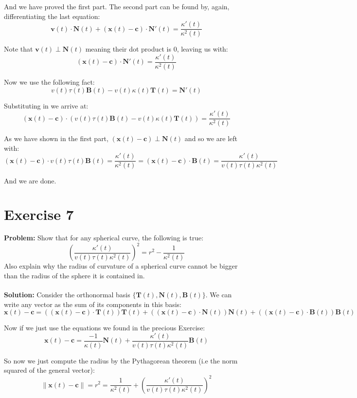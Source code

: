 \documentclass{article}
\begin{document}
And we have proved the first part. The second part can be found by, again, differentiating the last equation:
$$\mathbf v(t)\cdot\mathbf N(t)+(\mathbf x(t)-\mathbf c)\cdot\mathbf N'(t)=\frac{\kappa'(t)}{\kappa^2(t)}$$

Note that $\mathbf v(t)\perp\mathbf N(t)$ meaning their dot product is 0, leaving us with:
$$(\mathbf x(t)-\mathbf c)\cdot\mathbf N'(t)=\frac{\kappa'(t)}{\kappa^2(t)}$$

Now we use the following fact:
$$v(t)\tau(t)\mathbf B(t)-v(t)\kappa(t)\mathbf T(t)=\mathbf N'(t)$$

Substituting in we arrive at:
$$(\mathbf x(t)-\mathbf c)\cdot(v(t)\tau(t)\mathbf B(t)-v(t)\kappa(t)\mathbf T(t))=\frac{\kappa'(t)}{\kappa^2(t)}$$

As we have shown in the first part, $(\mathbf x(t)-\mathbf c)\perp\mathbf N(t)$ and so we are left with:
$$(\mathbf x(t)-\mathbf c)\cdot v(t)\tau(t)\mathbf B(t)=\frac{\kappa'(t)}{\kappa^2(t)}=(\mathbf x(t)-\mathbf c)\cdot\mathbf B(t)=\frac{\kappa'(t)}{v(t)\tau(t)\kappa^2(t)}$$

And we are done.

\section*{Exercise 7}
\textbf{Problem:} Show that for any spherical curve, the following is true:
$$\left(\frac{\kappa'(t)}{v(t)\tau(t)\kappa^2(t)}\right)^2=r^2-\frac{1}{\kappa^2(t)}$$
Also explain why the radius of curvature of a spherical curve cannot be bigger than the radius of the sphere it is contained in.
\\\\
\textbf{Solution:} Consider the orthonormal basis $\{\mathbf T(t),\mathbf N(t),\mathbf B(t)\}$. We can write any vector as the sum of its components in this basis:
$$\mathbf x(t)-\mathbf c=((\mathbf x(t)-\mathbf c)\cdot\mathbf T(t))\mathbf T(t)+((\mathbf x(t)-\mathbf c)\cdot\mathbf N(t))\mathbf N(t)+((\mathbf x(t)-\mathbf c)\cdot\mathbf B(t))\mathbf B(t)$$

Now if we just use the equations we found in the precious Exercise:
$$\mathbf x(t)-\mathbf c=\frac{-1}{\kappa(t)}\mathbf N(t)+\frac{\kappa'(t)}{v(t)\tau(t)\kappa^2(t)}\mathbf B(t)$$

So now we just compute the radius by the Pythagorean theorem (i.e the norm squared of the general vector):
$$\|\mathbf x(t)-\mathbf c\|=r^2=\frac{1}{\kappa^2(t)}+\left(\frac{\kappa'(t)}{v(t)\tau(t)\kappa^2(t)}\right)^2$$
\end{document}
